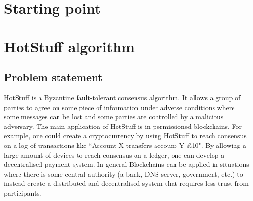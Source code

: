 




\section{Starting point}

\section{HotStuff algorithm}
\subsection{Problem statement}
HotStuff is a Byzantine fault-tolerant consensus algorithm. It allows a group of parties to agree on some piece of information under adverse conditions where some messages can be lost and some parties are controlled by a malicious adversary. The main application of HotStuff is in permissioned blockchains. For example, one could create a cryptocurrency by using HotStuff to reach consensus on a log of transactions like ``Account X transfers account Y £10". By allowing a large amount of devices to reach consensus on a ledger, one can develop a decentralised payment system. In general Blockchains can be applied in situations where there is some central authority (a bank, DNS server, government, etc.) to instead create a distributed and decentralised system that requires less trust from participants.

